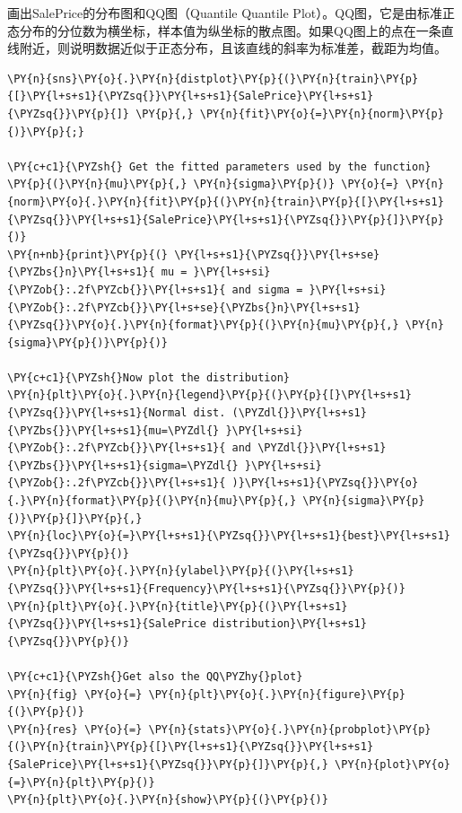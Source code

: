 \documentclass[no-math]{YangThesis}
\begin{document}
画出SalePrice的分布图和QQ图（Quantile Quantile
Plot）。QQ图，它是由标准正态分布的分位数为横坐标，样本值为纵坐标的散点图。如果QQ图上的点在一条直线附近，则说明数据近似于正态分布，且该直线的斜率为标准差，截距为均值。

\begin{tcolorbox}[breakable, size=fbox, boxrule=1pt, pad at break*=1mm,colback=cellbackground, colframe=cellborder]
	\begin{Verbatim}[commandchars=\\\{\}]
\PY{n}{sns}\PY{o}{.}\PY{n}{distplot}\PY{p}{(}\PY{n}{train}\PY{p}{[}\PY{l+s+s1}{\PYZsq{}}\PY{l+s+s1}{SalePrice}\PY{l+s+s1}{\PYZsq{}}\PY{p}{]} \PY{p}{,} \PY{n}{fit}\PY{o}{=}\PY{n}{norm}\PY{p}{)}\PY{p}{;}

\PY{c+c1}{\PYZsh{} Get the fitted parameters used by the function}
\PY{p}{(}\PY{n}{mu}\PY{p}{,} \PY{n}{sigma}\PY{p}{)} \PY{o}{=} \PY{n}{norm}\PY{o}{.}\PY{n}{fit}\PY{p}{(}\PY{n}{train}\PY{p}{[}\PY{l+s+s1}{\PYZsq{}}\PY{l+s+s1}{SalePrice}\PY{l+s+s1}{\PYZsq{}}\PY{p}{]}\PY{p}{)}
\PY{n+nb}{print}\PY{p}{(} \PY{l+s+s1}{\PYZsq{}}\PY{l+s+se}{\PYZbs{}n}\PY{l+s+s1}{ mu = }\PY{l+s+si}{\PYZob{}:.2f\PYZcb{}}\PY{l+s+s1}{ and sigma = }\PY{l+s+si}{\PYZob{}:.2f\PYZcb{}}\PY{l+s+se}{\PYZbs{}n}\PY{l+s+s1}{\PYZsq{}}\PY{o}{.}\PY{n}{format}\PY{p}{(}\PY{n}{mu}\PY{p}{,} \PY{n}{sigma}\PY{p}{)}\PY{p}{)}

\PY{c+c1}{\PYZsh{}Now plot the distribution}
\PY{n}{plt}\PY{o}{.}\PY{n}{legend}\PY{p}{(}\PY{p}{[}\PY{l+s+s1}{\PYZsq{}}\PY{l+s+s1}{Normal dist. (\PYZdl{}}\PY{l+s+s1}{\PYZbs{}}\PY{l+s+s1}{mu=\PYZdl{} }\PY{l+s+si}{\PYZob{}:.2f\PYZcb{}}\PY{l+s+s1}{ and \PYZdl{}}\PY{l+s+s1}{\PYZbs{}}\PY{l+s+s1}{sigma=\PYZdl{} }\PY{l+s+si}{\PYZob{}:.2f\PYZcb{}}\PY{l+s+s1}{ )}\PY{l+s+s1}{\PYZsq{}}\PY{o}{.}\PY{n}{format}\PY{p}{(}\PY{n}{mu}\PY{p}{,} \PY{n}{sigma}\PY{p}{)}\PY{p}{]}\PY{p}{,}
\PY{n}{loc}\PY{o}{=}\PY{l+s+s1}{\PYZsq{}}\PY{l+s+s1}{best}\PY{l+s+s1}{\PYZsq{}}\PY{p}{)}
\PY{n}{plt}\PY{o}{.}\PY{n}{ylabel}\PY{p}{(}\PY{l+s+s1}{\PYZsq{}}\PY{l+s+s1}{Frequency}\PY{l+s+s1}{\PYZsq{}}\PY{p}{)}
\PY{n}{plt}\PY{o}{.}\PY{n}{title}\PY{p}{(}\PY{l+s+s1}{\PYZsq{}}\PY{l+s+s1}{SalePrice distribution}\PY{l+s+s1}{\PYZsq{}}\PY{p}{)}

\PY{c+c1}{\PYZsh{}Get also the QQ\PYZhy{}plot}
\PY{n}{fig} \PY{o}{=} \PY{n}{plt}\PY{o}{.}\PY{n}{figure}\PY{p}{(}\PY{p}{)}
\PY{n}{res} \PY{o}{=} \PY{n}{stats}\PY{o}{.}\PY{n}{probplot}\PY{p}{(}\PY{n}{train}\PY{p}{[}\PY{l+s+s1}{\PYZsq{}}\PY{l+s+s1}{SalePrice}\PY{l+s+s1}{\PYZsq{}}\PY{p}{]}\PY{p}{,} \PY{n}{plot}\PY{o}{=}\PY{n}{plt}\PY{p}{)}
\PY{n}{plt}\PY{o}{.}\PY{n}{show}\PY{p}{(}\PY{p}{)}
	\end{Verbatim}
\end{tcolorbox}
\end{document}
